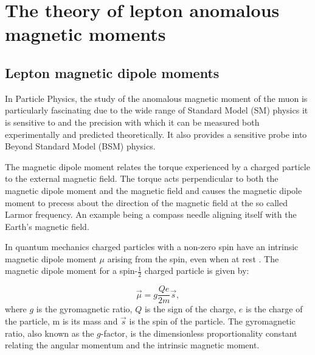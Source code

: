 
\chapter{The theory of lepton anomalous magnetic moments} %

\label{Chapter1} %


\newcommand{\keyword}[1]{\textbf{#1}}
\newcommand{\tabhead}[1]{\textbf{#1}}
\newcommand{\code}[1]{\texttt{#1}}
\newcommand{\file}[1]{\texttt{\bfseries#1}}
\newcommand{\option}[1]{\texttt{\itshape#1}}

\section{Lepton magnetic dipole moments}
 
In Particle Physics, the study of the anomalous magnetic moment of the muon is particularly fascinating due to the wide range of Standard Model (SM) physics it is sensitive to and the precision with which it can be measured both experimentally and predicted theoretically. It also provides a sensitive probe into Beyond Standard Model (BSM) physics. 
 
The magnetic dipole moment relates the torque experienced by a charged particle to the external magnetic field. The torque acts perpendicular to both the magnetic dipole moment and the magnetic field and causes the magnetic dipole moment to precess about the direction of the magnetic field at the so called Larmor frequency. An example being a compass needle aligning itself with the Earth’s magnetic field. 

In quantum mechanics charged particles with a non-zero spin have an intrinsic magnetic dipole moment $\mu$ arising from the spin, even when at rest \cite{Reference1}. 
The magnetic dipole moment for a spin-$\frac{1}{2}$ charged particle is given by:

\begin{equation}
\vec{\mu} = g\frac{Qe}{2m}\vec{s},
\end{equation}
where $g$ is the gyromagnetic ratio, $Q$ is the sign of the charge, $e$ is the charge of the particle, m is its mass and $\vec{s}$ is the spin of the particle. 
The gyromagnetic ratio, also known as the $g$-factor, is the dimensionless proportionality constant relating the angular momentum and the intrinsic magnetic moment.

